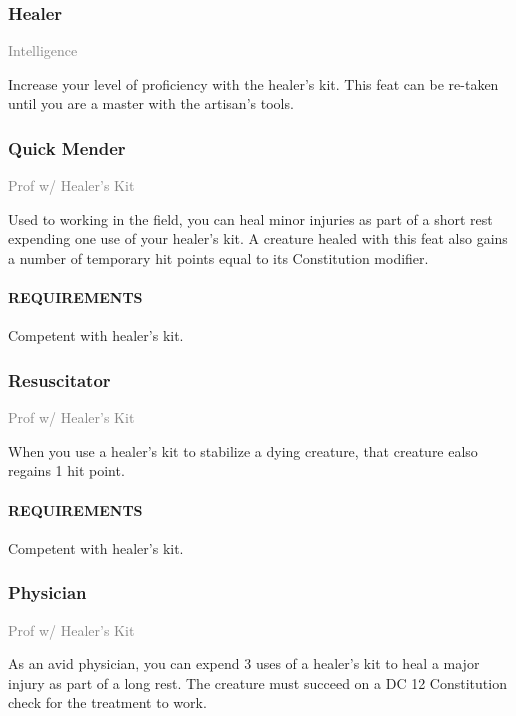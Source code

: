     \subsubsection{Healer} \label{feat::healer}
    \small{\textcolor{gray}{Intelligence}} %

    \normalsize
    Increase your level of proficiency with the healer's kit.
    This feat can be re-taken until you are a master with the artisan's tools.

    \subsubsection{Quick Mender} \label{feat::quickmender}
    \small{\textcolor{gray}{Prof w/ Healer's Kit}}

    \normalsize
    Used to working in the field, you can heal minor injuries as part of a short rest expending one use of your healer's kit.
    A creature healed with this feat also gains a number of temporary hit points equal to its Constitution modifier.
    \paragraph{REQUIREMENTS} Competent with healer's kit.

    \subsubsection{Resuscitator} \label{feat::resuscitator}
    \small{\textcolor{gray}{Prof w/ Healer's Kit}}

    \normalsize
    When you use a healer's kit to stabilize a dying creature, that creature ealso regains 1 hit point.
    \paragraph{REQUIREMENTS} Competent with healer's kit.

    \subsubsection{Physician} \label{feat::physician}
    \small{\textcolor{gray}{Prof w/ Healer's Kit}}

    \normalsize
    As an avid physician, you can expend 3 uses of a healer's kit to heal a major injury as part of a long rest.
    The creature must succeed on a DC 12 Constitution check for the treatment to work.
